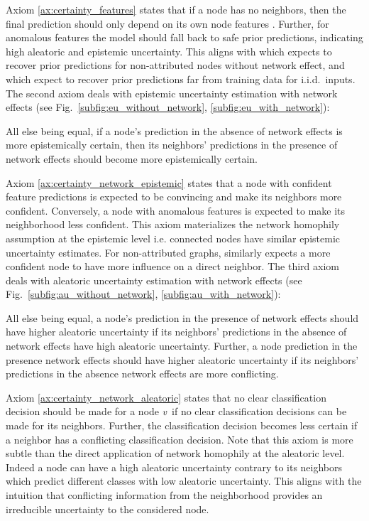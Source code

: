 Axiom \ref{ax:certainty_features} states that if a node \smash{$\nodev$} has no neighbors, then the final prediction \smash{$\p\nodeidxv$} should only depend on its own node features \smash{$\x\nodeidxv$}. Further, for anomalous features the model should fall back to safe prior predictions, indicating high aleatoric and epistemic uncertainty. This aligns with \cite{Eswaran2017} which expects to recover prior predictions for non-attributed nodes without network effect, and \cite{provable-uncertainty, NatPN2021} which expect to recover prior predictions far from training data for i.i.d.\ inputs. The second axiom deals with epistemic uncertainty estimation with network effects (see Fig.~\ref{subfig:eu_without_network}, \ref{subfig:eu_with_network}):
\begin{axiom}
    \label{ax:certainty_network_epistemic}
    All else being equal, if a node's prediction in the absence of network effects is more epistemically certain, then its neighbors' predictions in the presence of network effects should become more epistemically certain.
\end{axiom}
Axiom \ref{ax:certainty_network_epistemic} states that a node \smash{$\nodev$} with confident feature predictions \smash{$\x\nodeidxv$} is expected to be convincing and make its neighbors \smash{$\nodeu \in \neighbors(\nodev)$} more confident. Conversely, a node with anomalous features is expected to make its neighborhood less confident. This axiom materializes the network homophily assumption at the epistemic level i.e. connected nodes have similar epistemic uncertainty estimates. For non-attributed graphs, \cite{Eswaran2017} similarly expects a more confident node to have more influence on a direct neighbor. The third axiom deals with aleatoric uncertainty estimation with network effects (see Fig.~\ref{subfig:au_without_network}, \ref{subfig:au_with_network}):
\begin{axiom}
    \label{ax:certainty_network_aleatoric}
    All else being equal, a node's prediction in the presence of network effects should have higher aleatoric uncertainty if its neighbors' predictions in the absence of network effects have high aleatoric uncertainty. Further, a node prediction in the presence network effects should have higher aleatoric uncertainty if its neighbors' predictions in the absence network effects are more conflicting.
\end{axiom}
Axiom \ref{ax:certainty_network_aleatoric} states that no clear classification decision should be made for a node $\nodev$ if no clear classification decisions can be made for its neighbors. Further, the classification decision becomes less certain if a neighbor has a conflicting classification decision. Note that this axiom is more subtle than the direct application of network homophily at the aleatoric level. Indeed a node can have a high aleatoric uncertainty contrary to its neighbors which predict different classes with low aleatoric uncertainty. This aligns with the intuition that conflicting information from the neighborhood provides an irreducible uncertainty to the considered node.